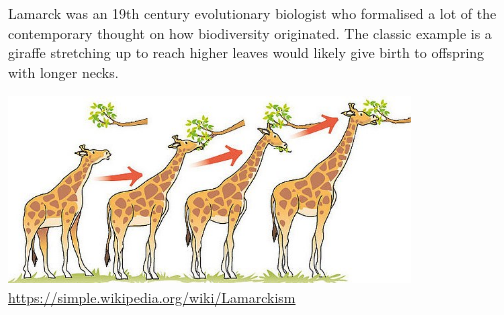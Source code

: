 \documentclass{beamer}
\begin{document}
\begin{frame}
{	Lamarck was an 19th century evolutionary biologist who formalised a lot of the contemporary thought on how biodiversity originated. The classic example is a giraffe stretching up to reach higher leaves would likely give birth to offspring with longer necks.
	
	\includegraphics[keepaspectratio, width  = 0.8\textwidth]{img/lamarck}\\
			\url{https://simple.wikipedia.org/wiki/Lamarckism}
}
\end{frame}
\end{document}
